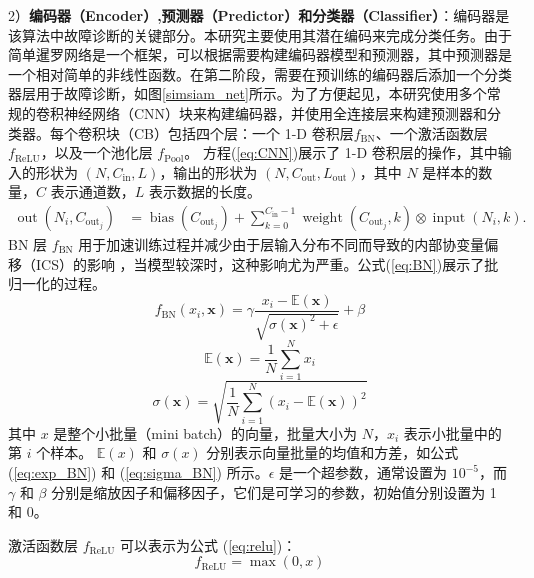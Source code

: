 \documentclass[master]{thesis-uestc}
\begin{document}
2）\textbf{编码器（Encoder）,预测器（Predictor）和分类器（Classifier）}：编码器是该算法中故障诊断的关键部分。本研究主要使用其潜在编码来完成分类任务。由于简单暹罗网络是一个框架，可以根据需要构建编码器模型和预测器，其中预测器是一个相对简单的非线性函数。在第二阶段，需要在预训练的编码器后添加一个分类器层用于故障诊断，如图\ref{simsiam_net}所示。为了方便起见，本研究使用多个常规的卷积神经网络（CNN）块来构建编码器，并使用全连接层来构建预测器和分类器。每个卷积块（CB）包括四个层：一个 1-D 卷积层\( f_{\text{BN}} \)、一个激活函数层 \( f_{\text{ReLU}} \)，以及一个池化层 \( f_{\text{Pool}} \)。 方程(\ref{eq:CNN})展示了 1-D 卷积层的操作，其中输入的形状为 \( (N, C_{\text{in}}, L) \)，输出的形状为 \( (N, C_{\text{out}}, L_{\text{out}}) \)，其中 \( N \) 是样本的数量，\( C \) 表示通道数，\( L \) 表示数据的长度。
\begin{equation}
    \begin{aligned}
    \operatorname{out}(N_i, C_{\mathrm{out}_j}) &= \operatorname{bias}(C_{\mathrm{out}_j}) + \sum_{k=0}^{C_{\mathrm{in}}-1} \operatorname{weight}(C_{\mathrm{out}_j}, k) \otimes \operatorname{input}(N_i, k).
    \end{aligned}
    \label{eq:CNN}
    \end{equation}
BN 层 \( f_{\text{BN}} \) 用于加速训练过程并减少由于层输入分布不同而导致的内部协变量偏移（ICS）的影响 ，当模型较深时，这种影响尤为严重。公式(\ref{eq:BN})展示了批归一化的过程。
\begin{equation}
    f_{\text{BN}}(x_i, \mathbf{x}) = \gamma \frac{x_i - \mathbb{E}(\mathbf{x})}{\sqrt{\sigma(\mathbf{x})^2 + \epsilon}} + \beta
\label{eq:BN}
\end{equation}    
\begin{equation}
\mathbb{E}(\mathbf{x}) = \frac{1}{N}\sum_{i=1}^N x_i
\label{eq:exp_BN}
\end{equation}
\begin{equation}
\sigma(\mathbf{x}) = \sqrt{\frac{1}{N}\sum_{i=1}^N (x_i - \mathbb{E}(\mathbf{x}))^2}
\label{eq:sigma_BN}
\end{equation}
其中 \( x \) 是整个小批量（mini batch）的向量，批量大小为 \( N \)，\( x_i \) 表示小批量中的第 \( i \) 个样本。  
\( \mathbb{E}(x) \) 和 \( \sigma(x) \) 分别表示向量批量的均值和方差，如公式 (\ref{eq:exp_BN}) 和 (\ref{eq:sigma_BN}) 所示。\( \epsilon \) 是一个超参数，通常设置为 \( 10^{-5} \)，而 \( \gamma \) 和 \( \beta \) 分别是缩放因子和偏移因子，它们是可学习的参数，初始值分别设置为 1 和 0。

激活函数层 \( f_{\text{ReLU}} \) 可以表示为公式 (\ref{eq:relu})：
\begin{equation}
    f_{\text{ReLU}} = \max(0, x)
    \label{eq:relu}
\end{equation}
\end{document}
